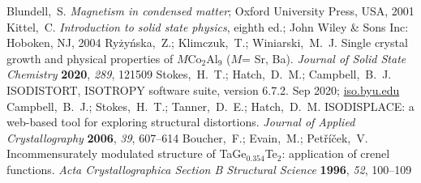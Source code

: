 \documentclass[journal=cmatex,manuscript=article]{achemso}
\begin{document}
\begin{mcitethebibliography}{73}
	\mciteSetBstMidEndSepPunct{\mcitedefaultmidpunct}
	{\mcitedefaultendpunct}{\mcitedefaultseppunct}\relax
	\EndOfBibitem
	Blundell,~S. \emph{Magnetism in condensed matter}; Oxford University Press,
	USA, 2001\relax
	\mciteBstWouldAddEndPuncttrue
	\mciteSetBstMidEndSepPunct{\mcitedefaultmidpunct}
	{\mcitedefaultendpunct}{\mcitedefaultseppunct}\relax
	\EndOfBibitem
	Kittel,~C. \emph{Introduction to solid state physics}, eighth ed.; John Wiley
	\& Sons Inc: Hoboken, NJ, 2004\relax
	\mciteBstWouldAddEndPuncttrue
	\mciteSetBstMidEndSepPunct{\mcitedefaultmidpunct}
	{\mcitedefaultendpunct}{\mcitedefaultseppunct}\relax
	\EndOfBibitem
	Ry\.zy\'nska,~Z.; Klimczuk,~T.; Winiarski,~M.~J. Single crystal growth and
	physical properties of {$M$}{Co}$_2${Al}$_9$ ({$M$}= {Sr}, {Ba}).
	\emph{Journal of Solid State Chemistry} \textbf{2020}, \emph{289},
	121509\relax
	\mciteBstWouldAddEndPuncttrue
	\mciteSetBstMidEndSepPunct{\mcitedefaultmidpunct}
	{\mcitedefaultendpunct}{\mcitedefaultseppunct}\relax
	\EndOfBibitem
	Stokes,~H.~T.; Hatch,~D.~M.; Campbell,~B.~J. {ISODISTORT}, {ISOTROPY} software
	suite, version 6.7.2. Sep 2020; \url{iso.byu.edu}\relax
	\mciteBstWouldAddEndPuncttrue
	\mciteSetBstMidEndSepPunct{\mcitedefaultmidpunct}
	{\mcitedefaultendpunct}{\mcitedefaultseppunct}\relax
	\EndOfBibitem
	Campbell,~B.~J.; Stokes,~H.~T.; Tanner,~D.~E.; Hatch,~D.~M. {ISODISPLACE}: a
	web-based tool for exploring structural distortions. \emph{Journal of Applied
		Crystallography} \textbf{2006}, \emph{39}, 607--614\relax
	\mciteBstWouldAddEndPuncttrue
	\mciteSetBstMidEndSepPunct{\mcitedefaultmidpunct}
	{\mcitedefaultendpunct}{\mcitedefaultseppunct}\relax
	\EndOfBibitem
	Boucher,~F.; Evain,~M.; Pet{\v{r}}{\'{i}}{\v{c}}ek,~V. Incommensurately
	modulated structure of {TaGe}$_{0.354}${Te}$_2$: application of crenel
	functions. \emph{Acta Crystallographica Section B Structural Science}
	\textbf{1996}, \emph{52}, 100--109\relax
	\mciteBstWouldAddEndPuncttrue
	\mciteSetBstMidEndSepPunct{\mcitedefaultmidpunct}
	{\mcitedefaultendpunct}{\mcitedefaultseppunct}\relax

\end{mcitethebibliography}
\end{document}
